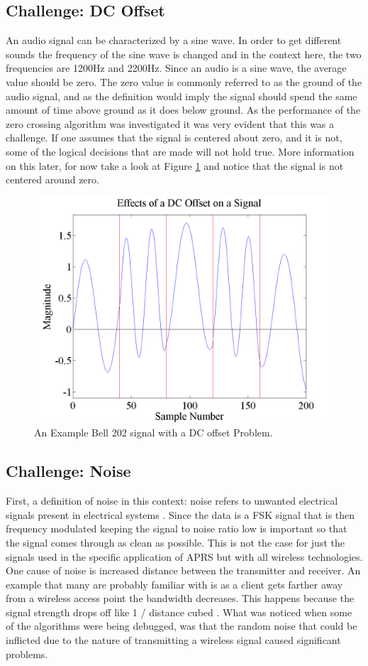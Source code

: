 \subsection{Challenge: DC Offset}
An audio signal can be characterized by a sine wave. In order to get different sounds the frequency of the sine wave is changed and in the context here, the two frequencies are 1200Hz and 2200Hz. Since an audio is a sine wave, the average value should be zero. The zero value is commonly referred to as the ground of the audio signal, and as the definition would imply the signal should spend the same amount of time above ground as it does below ground. As the performance of the zero crossing algorithm was investigated it was very evident that this was a challenge. If one assumes that the signal is centered about zero, and it is not, some of the logical decisions that are made will not hold true. More information on this later, for now take a look at Figure \ref{DCOffsetExample} and notice that the signal is not centered around zero.
\begin{figure}
  \centering
	\includegraphics[width=0.75\linewidth]{images/EffectsofaDCOffsetonaSignal.png} 
	\caption{An Example Bell 202 signal with a DC offset Problem.}
   \label{DCOffsetExample}
\end{figure}

\subsection{Challenge: Noise}
First, a definition of noise in this context: noise refers to unwanted electrical signals present in electrical systems \cite{Sklar1988}. Since the data is a FSK signal that is then frequency modulated keeping the signal to noise ratio low is important so that the signal comes through as clean as possible. This is not the case for just the signals used in the specific application of APRS but with all wireless technologies. One cause of noise is increased distance between the transmitter and receiver. An example that many are probably familiar with is as a client gets farther away from a wireless access point the bandwidth decreases. This happens because the signal strength drops off like 1 / distance cubed \cite{4Gon}. What was noticed when some of the algorithms were being debugged, was that the random noise that could be inflicted due to the nature of transmitting a wireless signal caused significant problems.

